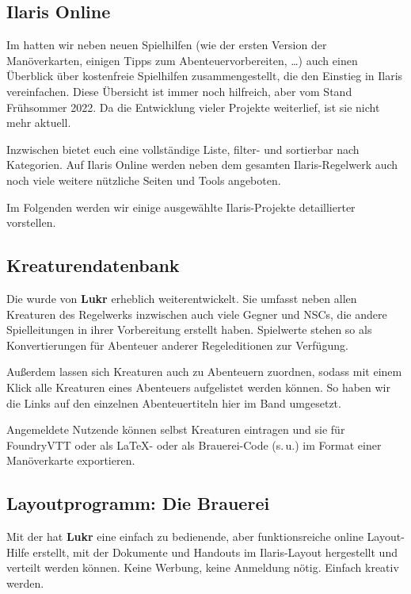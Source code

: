 \spaltenanfang
\subsection*{Ilaris Online}
Im 
hatten wir neben neuen Spielhilfen (wie der ersten Version der Manöverkarten, einigen Tipps zum Abenteuervorbereiten, \dots) auch einen Überblick über kostenfreie Spielhilfen zusammengestellt, die den Einstieg in Ilaris vereinfachen.
Diese Übersicht ist immer noch hilfreich, aber vom Stand Früh\-som\-mer 2022.
Da die Entwicklung vieler Projekte weiterlief, ist sie nicht mehr aktuell.

Inzwischen bietet euch  eine vollständige Liste, filter- und sortierbar nach Kategorien.
Auf Ilaris Online werden neben dem gesamten Ilaris-Regelwerk auch noch viele weitere nützliche Seiten und Tools angeboten.

Im Folgenden werden wir einige ausgewählte Ilaris-Projekte detaillierter vorstellen.

\subsection*{Kreaturendatenbank}
Die  wurde von \textbf{Lukr} erheblich weiterentwickelt.
Sie umfasst neben allen Kreaturen des Regelwerks inzwischen auch viele Gegner und NSCs, die andere Spielleitungen in ihrer Vorbereitung erstellt haben.
Spielwerte stehen so als Konvertierungen für Abenteuer anderer Regeleditionen zur Verfügung.

Außerdem lassen sich Kreaturen auch zu Abenteuern zuordnen, sodass mit einem Klick alle Kreaturen eines Abenteuers aufgelistet werden können. So haben wir die Links auf den einzelnen Abenteuertiteln hier im Band umgesetzt.

Angemeldete Nutzende können selbst Kreaturen eintragen und sie für FoundryVTT oder als LaTeX- oder als Brauerei-Code (s.\,u.) im Format einer Manöverkarte exportieren.



\columnbreak

\subsection*{Layoutprogramm: Die Brauerei}
Mit der  hat \textbf{Lukr} eine einfach zu bedienende, aber funktionsreiche online Layout-Hilfe erstellt, mit der Dokumente und Handouts im Ilaris-Layout hergestellt und verteilt werden können. Keine Werbung, keine Anmeldung nötig. Einfach kreativ werden. 

